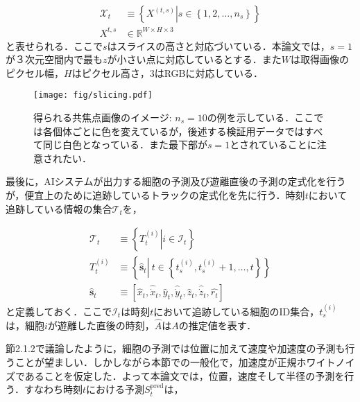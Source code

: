 \begin{equation}
    \label{eq:input_images}
    \begin{aligned}
        \mathcal{X}_t &\equiv \left\{ \left.X^{(t,s)}\right| s \in \left\{1,2,\dots,n_s\right\} \right\}
        \\ X^{t,s} &\in \mathbb{R}^{W \times H \times 3}
    \end{aligned}
\end{equation}
と表せられる．ここで$s$はスライスの高さと対応づいている．本論文では，$s=1$が３次元空間内で最も$z$が小さい点に対応しているとする．また$W$は取得画像のピクセル幅，$H$はピクセル高さ，$3$はRGBに対応している．

\begin{figure}[t]
    \centering
    \texttt{[image: fig/slicing.pdf]}
    \caption[得られる共焦点画像のイメージ]{得られる共焦点画像のイメージ: $n_s=10$の例を示している．ここでは各個体ごとに色を変えているが，後述する検証用データではすべて同じ白色となっている．また最下部が$s=1$とされていることに注意されたい．}
    \label{fig:slicing}
\end{figure}

\par
最後に，AIシステムが出力する細胞の予測及び遊離直後の予測の定式化を行うが，便宜上のために追跡しているトラックの定式化を先に行う．時刻$t$において追跡している情報の集合$\mathcal{T}_t$を，

\begin{equation}
    \begin{aligned}
        \mathcal{T}_t &\equiv \left\{ \left. T_t^{(i)}\right|i \in \mathcal{I}_t\right\}
        \\ T_t^{(i)} &\equiv \left\{ \hat{\bm{s}}_t \left|\ t \in \left\{t_s^{(i)}, t_s^{(i)}+1,\dots, t\right\} \right.\right\}
        \\\hat{\bm{s}}_{t} &\equiv \left[\hat{x}_{t}, \hat{\dot{x}}_{t}, \hat{y}_{t}, \hat{\dot{y}}_{t}, \hat{z}_{t}, \hat{\dot{z}}_{t}, \hat{r_{t}}\right]
    \end{aligned}
\end{equation}
と定義しておく．ここで$\mathcal{I}_t$は時刻$t$において追跡している細胞のID集合，$t_s^{(i)}$は，細胞$i$が遊離した直後の時刻，$\hat{A}$は$A$の推定値を表す．

節2.1.2で議論したように，細胞の予測では位置に加えて速度や加速度の予測も行うことが望ましい．しかしながら本節での一般化で，加速度が正規ホワイトノイズであることを仮定した．よって本論文では，位置，速度そして半径の予測を行う．すなわち時刻$t$における予測$S^{\text{pred}}_t$は，

